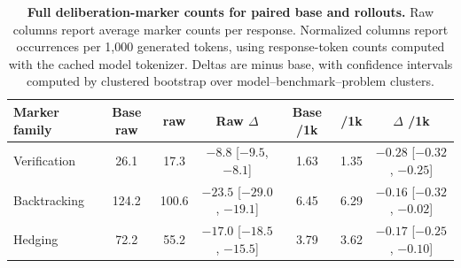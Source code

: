 \begin{table}[t]
\centering
\caption{\textbf{Full deliberation-marker counts for paired base and \opsd{} rollouts.}
Raw columns report average marker counts per response. Normalized columns report occurrences per 1,000 generated tokens, using response-token counts computed with the cached model tokenizer. Deltas are \opsd{} minus base, with confidence intervals computed by clustered bootstrap over model--benchmark--problem clusters.}
\label{tab:deliberation_markers_full}
\small
\setlength{\tabcolsep}{4pt}
\renewcommand{\arraystretch}{1.12}
\begin{tabular*}{\textwidth}{@{\extracolsep{\fill}}lcccccc@{}}
\toprule
\textbf{Marker family}
& \textbf{Base raw}
& \textbf{\opsd{} raw}
& \textbf{Raw $\Delta$}
& \textbf{Base /1k}
& \textbf{\opsd{} /1k}
& \textbf{$\Delta$ /1k} \\
\midrule
Verification
& 26.1
& 17.3
& $-8.8$ [$-9.5$, $-8.1$]
& 1.63
& 1.35
& $-0.28$ [$-0.32$, $-0.25$] \\
Backtracking
& 124.2
& 100.6
& $-23.5$ [$-29.0$, $-19.1$]
& 6.45
& 6.29
& $-0.16$ [$-0.32$, $-0.02$] \\
Hedging
& 72.2
& 55.2
& $-17.0$ [$-18.5$, $-15.5$]
& 3.79
& 3.62
& $-0.17$ [$-0.25$, $-0.10$] \\
\bottomrule
\end{tabular*}
\end{table}
